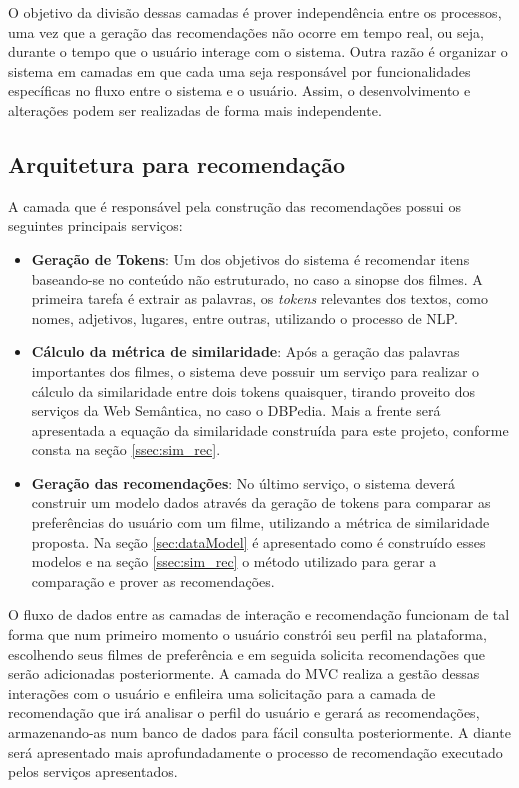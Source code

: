 O objetivo da divisão dessas camadas é prover independência entre os processos, uma vez que a geração das recomendações não ocorre em tempo real, ou seja, durante o tempo que o usuário interage com o sistema. Outra razão é organizar o sistema em camadas em que cada uma seja responsável por funcionalidades específicas no fluxo entre o sistema e o usuário. Assim, o desenvolvimento e alterações podem ser realizadas de forma mais independente.

\subsection{Arquitetura para recomendação}

A camada que é responsável pela construção das recomendações possui os seguintes principais serviços:

\begin{itemize}
	\item{\textbf{Geração de Tokens}: Um dos objetivos do sistema é recomendar itens baseando-se no conteúdo não estruturado, no caso a sinopse dos filmes. A primeira tarefa é extrair as palavras, os \textit{tokens} relevantes dos textos, como nomes, adjetivos, lugares, entre outras, utilizando o processo de \ac{NLP}.}
	
	\item{\textbf{Cálculo da métrica de similaridade}: Após a geração das palavras importantes dos filmes, o sistema deve possuir um serviço para realizar o cálculo da similaridade entre dois tokens quaisquer, tirando proveito dos serviços da Web Semântica, no caso o DBPedia. Mais a frente será apresentada a equação da similaridade construída para este projeto, conforme consta na seção \ref{ssec:sim_rec}.}
	
	\item{\textbf{Geração das recomendações}: No último serviço, o sistema deverá construir um modelo dados através da geração de tokens para comparar as preferências do usuário com um filme, utilizando a métrica de similaridade proposta. Na seção \ref{sec:dataModel} é apresentado como é construído esses modelos e na seção \ref{ssec:sim_rec} o método utilizado para gerar a comparação e prover as recomendações.}
\end{itemize}

O fluxo de dados entre as camadas de interação e recomendação funcionam de tal forma que num primeiro momento o usuário constrói seu perfil na plataforma, escolhendo seus filmes de preferência e em seguida solicita recomendações que serão adicionadas posteriormente. A camada do \ac{MVC} realiza a gestão dessas interações com o usuário e enfileira uma solicitação para a camada de recomendação que irá analisar o perfil do usuário e gerará as recomendações, armazenando-as num banco de dados para fácil consulta posteriormente. A diante será apresentado mais aprofundadamente o processo de recomendação executado pelos serviços apresentados.

